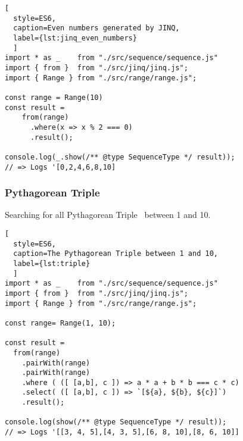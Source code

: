 \begin{lstlisting}[
  style=ES6, 
  caption=Even numbers generated by JINQ,
  label={lst:jinq_even_numbers}
  ]
import * as _    from "./src/sequence/sequence.js"
import { from }  from "./src/jinq/jinq.js";
import { Range } from "./src/range/range.js";

const range = Range(10)
const result =
    from(range)
      .where(x => x % 2 === 0)
      .result();

console.log(_.show(/** @type SequenceType */ result));
// => Logs '[0,2,4,6,8,10]
\end{lstlisting}

\subsubsection{Pythagorean Triple}
\label{subsub:JINQ_Pythagorean Triple}
Searching for all Pythagorean Triple~\cite{pythagorean_triple} between 1 and 10.

\begin{lstlisting}[
  style=ES6, 
  caption=The Pythagorean Triple between 1 and 10,
  label={lst:triple}
  ]
import * as _    from "./src/sequence/sequence.js"
import { from }  from "./src/jinq/jinq.js";
import { Range } from "./src/range/range.js";

const range= Range(1, 10);

const result =
  from(range)
    .pairWith(range)
    .pairWith(range)
    .where ( ([ [a,b], c ]) => a * a + b * b === c * c)
    .select( ([ [a,b], c ]) => `[${a}, ${b}, ${c}]`)
    .result();

console.log(show(/** @type SequenceType */ result));
// => Logs '[[3, 4, 5],[4, 3, 5],[6, 8, 10],[8, 6, 10]]
\end{lstlisting}
